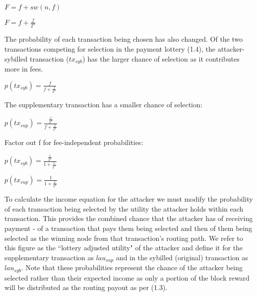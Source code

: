 \documentclass[oneside]{article}   	%
\begin{document}
\begin{multicols}{2}
\large
\begin{adjustwidth}{1.5em}{1.5em} 
	\begin{math}
F = f + sw(n, f)
	\end{math}

	\begin{math}
F = f + \frac{f}{2^{n}}
	\end{math}
\end{adjustwidth}
\normalsize

The probability of each transaction being chosen has also changed. Of the two transactions competing for selection in the payment lottery (1.4), the attacker-sybilled transaction (\begin{math}tx_{syb}\end{math}) has the larger chance of selection as it contributes more in fees.

\large
\begin{adjustwidth}{1.5em}{1.5em} 
	\begin{math}
p(tx_{syb}) = \frac{f}{f + \frac{f}{2^n}}
	\end{math}
\end{adjustwidth}
\normalsize

The supplementary transaction has a smaller chance of selection:

\large
\begin{adjustwidth}{1.5em}{1.5em} 
	\begin{math}
p(tx_{sup}) = \frac{\frac{f}{2^n}}{f + \frac{f}{2^n}}
	\end{math}
\end{adjustwidth}
\normalsize

Factor out f for fee-independent probabilities:

\large
\begin{adjustwidth}{1.5em}{1.5em} 
	\begin{math}
p(tx_{syb}) = \frac{\frac{1}{2^n}}{1 + \frac{1}{2^n}}
	\end{math}

	\begin{math}
p(tx_{sup}) = \frac{1}{1 + \frac{1}{2^n}}
	\end{math}
\end{adjustwidth}
\normalsize

To calculate the income equation for the attacker we must modify the probability of each transaction being selected by the utility the attacker holds within each transaction. This provides the combined chance that the attacker has of receiving payment - of a transaction that pays them being selected and then of them being selected as the winning node from that transaction's routing path. We refer to this figure as the ``lottery adjusted utility" of the attacker and define it for the supplementary transaction as \begin{math}lau_{sup}\end{math} and in the sybilled (original) transaction as \begin{math}lau_{syb}\end{math}. Note that these probabilities represent the chance of the attacker being selected rather than their expected income as only a portion of the block reward will be distributed as the routing payout as per (1.3).


\end{multicols}
\end{document}
